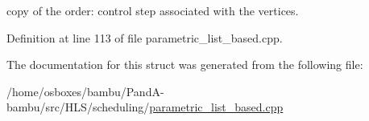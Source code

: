 copy of the order\+: control step associated with the vertices. 



Definition at line 113 of file parametric\+\_\+list\+\_\+based.\+cpp.



The documentation for this struct was generated from the following file\+:\begin{DoxyCompactItemize}
\item 
/home/osboxes/bambu/\+Pand\+A-\/bambu/src/\+H\+L\+S/scheduling/\hyperlink{parametric__list__based_8cpp}{parametric\+\_\+list\+\_\+based.\+cpp}\end{DoxyCompactItemize}
